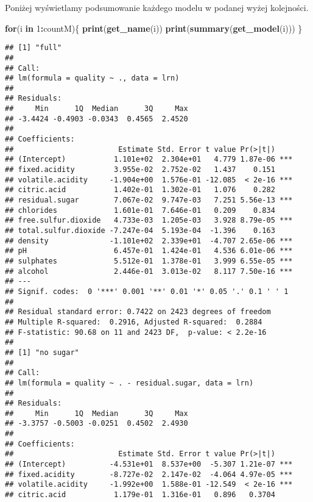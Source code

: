 \documentclass[
]{article}
\newenvironment{Shaded}{\begin{snugshade}}{\end{snugshade}}
\newcommand{\ControlFlowTok}[1]{\textcolor[rgb]{0.13,0.29,0.53}{\textbf{#1}}}
\newcommand{\DecValTok}[1]{\textcolor[rgb]{0.00,0.00,0.81}{#1}}
\newcommand{\FunctionTok}[1]{\textcolor[rgb]{0.13,0.29,0.53}{\textbf{#1}}}
\newcommand{\NormalTok}[1]{#1}
\newcommand{\SpecialCharTok}[1]{\textcolor[rgb]{0.81,0.36,0.00}{\textbf{#1}}}
\begin{document}
Poniżej wyświetlamy podsumowanie każdego modelu w podanej wyżej
kolejności.

\begin{Shaded}
\begin{Highlighting}[]
\ControlFlowTok{for}\NormalTok{(i }\ControlFlowTok{in} \DecValTok{1}\SpecialCharTok{:}\NormalTok{countM)\{}
  \FunctionTok{print}\NormalTok{(}\FunctionTok{get\_name}\NormalTok{(i))}
  \FunctionTok{print}\NormalTok{(}\FunctionTok{summary}\NormalTok{(}\FunctionTok{get\_model}\NormalTok{(i)))}
\NormalTok{\}}
\end{Highlighting}
\end{Shaded}

\begin{verbatim}
## [1] "full"
## 
## Call:
## lm(formula = quality ~ ., data = lrn)
## 
## Residuals:
##     Min      1Q  Median      3Q     Max 
## -3.4424 -0.4903 -0.0343  0.4565  2.4520 
## 
## Coefficients:
##                        Estimate Std. Error t value Pr(>|t|)    
## (Intercept)           1.101e+02  2.304e+01   4.779 1.87e-06 ***
## fixed.acidity         3.955e-02  2.752e-02   1.437    0.151    
## volatile.acidity     -1.904e+00  1.576e-01 -12.085  < 2e-16 ***
## citric.acid           1.402e-01  1.302e-01   1.076    0.282    
## residual.sugar        7.067e-02  9.747e-03   7.251 5.56e-13 ***
## chlorides             1.601e-01  7.646e-01   0.209    0.834    
## free.sulfur.dioxide   4.733e-03  1.205e-03   3.928 8.79e-05 ***
## total.sulfur.dioxide -7.247e-04  5.193e-04  -1.396    0.163    
## density              -1.101e+02  2.339e+01  -4.707 2.65e-06 ***
## pH                    6.457e-01  1.424e-01   4.536 6.01e-06 ***
## sulphates             5.512e-01  1.378e-01   3.999 6.55e-05 ***
## alcohol               2.446e-01  3.013e-02   8.117 7.50e-16 ***
## ---
## Signif. codes:  0 '***' 0.001 '**' 0.01 '*' 0.05 '.' 0.1 ' ' 1
## 
## Residual standard error: 0.7422 on 2423 degrees of freedom
## Multiple R-squared:  0.2916, Adjusted R-squared:  0.2884 
## F-statistic: 90.68 on 11 and 2423 DF,  p-value: < 2.2e-16
## 
## [1] "no sugar"
## 
## Call:
## lm(formula = quality ~ . - residual.sugar, data = lrn)
## 
## Residuals:
##     Min      1Q  Median      3Q     Max 
## -3.3757 -0.5003 -0.0251  0.4502  2.4930 
## 
## Coefficients:
##                        Estimate Std. Error t value Pr(>|t|)    
## (Intercept)          -4.531e+01  8.537e+00  -5.307 1.21e-07 ***
## fixed.acidity        -8.727e-02  2.147e-02  -4.064 4.97e-05 ***
## volatile.acidity     -1.992e+00  1.588e-01 -12.549  < 2e-16 ***
## citric.acid           1.179e-01  1.316e-01   0.896   0.3704    

\end{verbatim}
\end{document}
